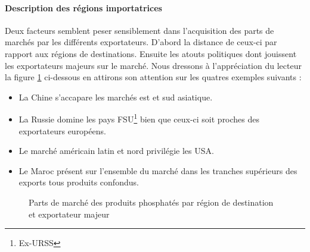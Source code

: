 		\paragraph{Description des régions importatrices\\}
		Deux facteurs semblent peser sensiblement dans l'acquisition des parts de marchés par les différents exportateurs. D'abord la distance de ceux-ci par rapport aux régions de destinations. Ensuite les atouts politiques dont jouissent les exportateurs majeurs sur le marché. Nous dressons à l'appréciation du lecteur la figure \ref{fig:destReg} ci-dessous en attirons son attention sur les quatres exemples suivants :
		\begin{itemize}
		\item La Chine s'accapare les marchés est et sud asiatique. 
		\item La Russie domine les pays FSU\footnote{Ex-URSS} bien que ceux-ci soit proches des exportateurs européens.
		\item Le marché américain latin et nord privilégie les USA.
		\item Le Maroc présent sur l'ensemble du marché dans les tranches supérieurs des exports tous produits confondus.
		\end{itemize}
				\begin{figure}[H]
				\centering
				\caption{Parts de marché des produits phosphatés par région de destination et exportateur majeur}
				\label{fig:destReg}
				\end{figure}	
